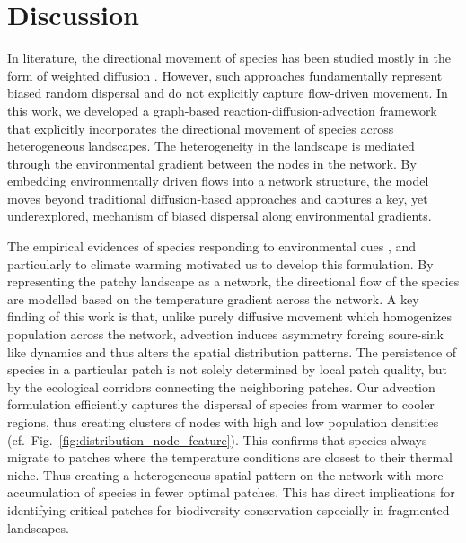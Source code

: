 \documentclass[12pt]{article}
\begin{document}
\section{Discussion}

In literature, the directional movement of species has been studied mostly in the form of weighted diffusion \cite{prima2018combining}. However, such approaches fundamentally represent biased random dispersal and do not explicitly capture flow-driven movement. In this work, we developed a graph-based reaction-diffusion-advection framework that explicitly incorporates the directional movement of species across heterogeneous landscapes. The heterogeneity in the landscape is mediated through the environmental gradient between the nodes in the network. By embedding environmentally driven flows into a network structure, the model moves beyond traditional diffusion-based approaches and captures a key, yet underexplored, mechanism of biased dispersal along environmental gradients.

The empirical evidences of species responding to environmental cues \cite{chen2011rapid,lenoir2020species}, and particularly to climate warming motivated us to develop this formulation. By representing the patchy landscape as a network, the directional flow of the species are modelled based on the temperature gradient across the network. A key finding of this work is that, unlike purely diffusive movement which homogenizes population across the network, advection induces asymmetry forcing soure-sink like dynamics \cite{bisschop2019transient} and thus alters the spatial distribution patterns. The persistence of species in a particular patch is not solely determined by local patch quality, but by the ecological corridors connecting the neighboring patches. Our advection formulation efficiently captures the dispersal of species from warmer to cooler regions, thus creating clusters of nodes with high and low population densities (cf.~Fig.~\ref{fig:distribution_node_feature}). This confirms that species always migrate to patches where the temperature conditions are closest to their thermal niche. Thus creating a heterogeneous spatial pattern on the network with more accumulation of species in fewer optimal patches. This has direct implications for identifying critical patches for biodiversity conservation especially in fragmented landscapes.
\end{document}
